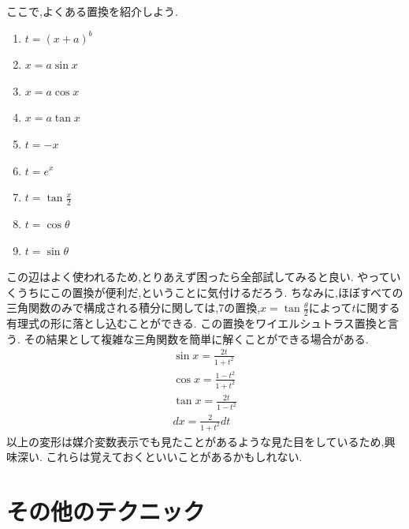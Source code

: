 ﻿\documentclass[dvipdfmx,a4paper,11pt,fleqn]{jsarticle}
\begin{document}
ここで,よくある置換を紹介しよう.

\begin{enumerate}
  \item $t=(x+a)^b$
  \item $x=a\sin x$
  \item $x=a\cos x$
  \item $x=a\tan x$
  \item $t=-x$
  \item $t=e^x$
  \item \vspace{3pt}$\displaystyle t=\tan \frac{x}{2}$
  \vspace{3pt} \item $t=\cos \theta$
  \item $t=\sin \theta$
\end{enumerate}
この辺はよく使われるため,とりあえず困ったら全部試してみると良い.
やっていくうちにこの置換が便利だ,ということに気付けるだろう.
ちなみに,ほぼすべての三角関数のみで構成される積分に関しては,7の置換,$x=\tan \frac{\theta}{2}$によって$t$に関する有理式の形に落とし込むことができる.
この置換をワイエルシュトラス置換と言う.
その結果として複雑な三角関数を簡単に解くことができる場合がある.
\begin{align}
  \sin x = \frac{2t}{1+t^2}\\
  \cos x = \frac{1-t^2}{1+t^2}\\
  \tan x = \frac{2t}{1-t^2}\\
  dx = \frac{2}{1+t^2}dt 
\end{align}
以上の変形は媒介変数表示でも見たことがあるような見た目をしているため,興味深い.
これらは覚えておくといいことがあるかもしれない.

\section{その他のテクニック}
\end{document}
